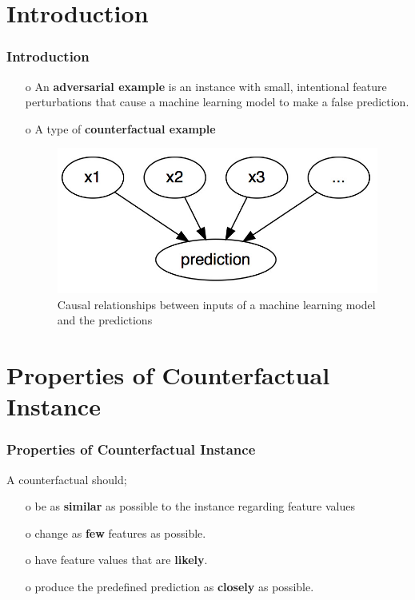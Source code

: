 \documentclass[12pt]{beamer}
\begin{document}
\section{Introduction}
\begin{frame}
\frametitle{Introduction}
	\begin{itemize}
		\item[o] An \textbf{adversarial example} is an instance with small, intentional feature perturbations that cause a machine learning model to make a false prediction.\protect\footnotemark
		
		\item[o] A type of \textbf{counterfactual example}
		
		\begin{figure}
			\centering
			\includegraphics[width=0.7\linewidth,height=0.3\textheight]{img/graph}
			\caption{Causal relationships between inputs of a machine learning model and the predictions}
			\label{fig:graph}
		\end{figure}
		
	\end{itemize}
	
\end{frame}

\section{Properties of Counterfactual Instance}
\begin{frame}
\frametitle{Properties of Counterfactual Instance}
A counterfactual should;
\begin{itemize}
	\item[o] be as \textbf{similar} as possible to the instance regarding feature values \pause
	\item[o] change as \textbf{few} features as possible. \pause
	\item[o] have feature values that are \textbf{likely}. \pause
	\item[o] produce the predefined prediction as \textbf{closely} as possible.
\end{itemize}
\end{frame}
\end{document}
